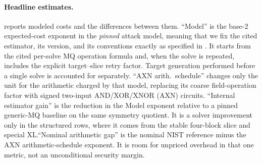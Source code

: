 \documentclass[11pt]{article}
\begin{document}
\paragraph{Headline estimates.}
 reports modeled costs and the differences between them.
``Model'' is the base-2 expected-cost exponent in the \emph{pinned} attack
model, meaning that we fix the cited estimator, its version, and its conventions
exactly as specified in
.  It starts from the cited per-solve MQ
operation formula and, when the solve is repeated, includes
the explicit target--slice retry factor.  Target generation performed before a
single solve is accounted for separately.  ``AXN arith.\ schedule'' changes
only the unit for the arithmetic charged by that model, replacing its coarse
field-operation factor with signed two-input AND/XOR/XNOR (AXN) circuits.  ``Internal estimator gain'' is the
reduction in the Model exponent
relative to a pinned generic-MQ baseline on the same symmetry quotient.  It is
a solver improvement only in the structured rows, where it comes from the
stable four-block slice and special XL.\@  ``Nominal arithmetic gap'' is the
nominal NIST reference minus the AXN arithmetic-schedule exponent.  It
is room for unpriced overhead in that one metric, not an unconditional
security margin.
\end{document}
